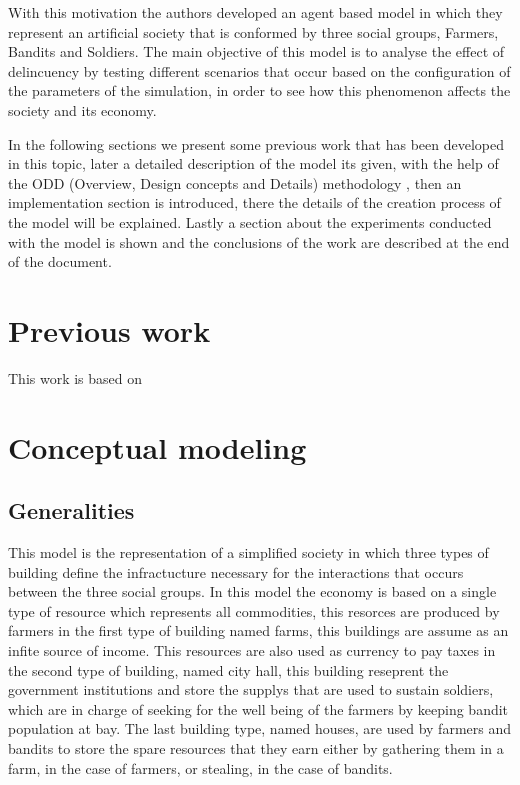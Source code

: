 \documentclass{wscpaperproc}
\theoremstyle{wsc}
\begin{document}
With this motivation the authors developed an agent based model in which they
represent an artificial society that is conformed by three social groups,
Farmers, Bandits and Soldiers. The main objective of this model is to
analyse the effect of delincuency by testing different scenarios that
occur based on the configuration of the parameters of the simulation,
in order to see how this phenomenon affects the society and its
economy.

In the following sections we present some previous work that has been developed
in this topic, later a detailed description of the model its given, with the
help of the ODD (Overview, Design concepts and Details) methodology \cite{odd},
then an implementation section is introduced, there the details of the creation 
process of the model will be explained. Lastly a section about the experiments
conducted with the model is shown and the conclusions of the work are described
at the end of the document.

\section{Previous work}

This work is based on \cite{article1} \cite{article2}

\section{Conceptual modeling}

\subsection{Generalities}

This model is the representation of a simplified society in which three types
of building define the infractucture necessary for the interactions that occurs
between the three social groups. In this model the
economy is based on a single type of resource which represents all commodities,
this resorces are produced by farmers in the first type of building named
farms, this buildings are assume as an infite source of income. This
resources are also used as currency to pay taxes in the second type of
building, named city hall, this building reseprent the government
institutions and store the supplys that are used to sustain soldiers,
which are in charge of seeking for the well being of the farmers by
keeping bandit population at bay. The last building type, named houses,
are used by farmers and bandits to store the spare resources that they
earn either by gathering them in a farm, in the case of farmers, or
stealing, in the case of bandits.
\end{document}
